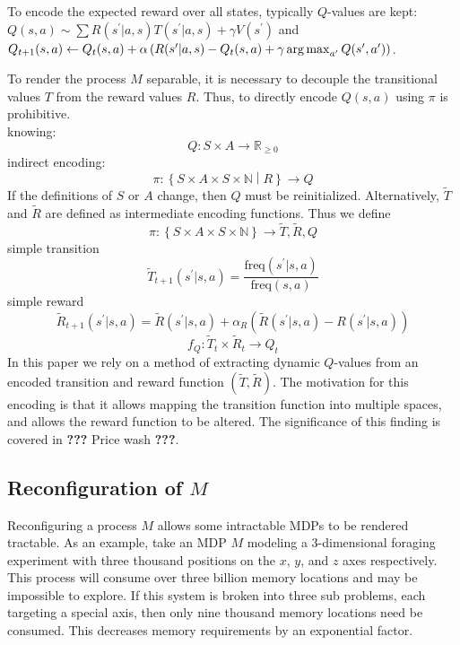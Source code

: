 To encode the expected reward over all states, typically $Q$-values are kept: $ Q(s,a) \sim \sum R(s^\prime|a,s)T(s^\prime|a,s)+\gamma V(s^\prime) $ and $ Q_{t+1}(s,a) \leftarrow Q_t(s,a)+\alpha \left( R(s^\prime|a,s)-Q_t(s,a)+\gamma\operatorname*{arg\,max}_{a^\prime} Q(s^\prime,a^\prime) \right) $.

To render the process $M$ separable, it is necessary to decouple the transitional values $T$ from the reward values $R$. Thus, to directly encode $Q(s,a)$ using $\pi$ is prohibitive.\\
knowing: 
\begin{equation*}
Q: S \times A \to \mathbb{R}_{\geq 0}
\end{equation*}
indirect encoding:
\begin{equation*}
\pi: \left\{ S \times A \times S \times \mathbb{N} \middle| R \right\} \to Q
\end{equation*}
If the definitions of $S$ or $A$ change, then $Q$ must be reinitialized. Alternatively, $\tilde{T}$ and $\tilde{R}$ are defined as intermediate encoding functions. Thus we define
\begin{equation*}
\pi:\left\{S \times A \times S \times \mathbb{N}\right\} \to \tilde{T}, \tilde{R}, Q
\end{equation*} 
simple transition
\begin{equation*}
\tilde{T}_{t+1}(s^\prime|s,a) = \frac{\textrm{freq}(s^\prime|s,a)}{\textrm{freq}(s,a)}
\end{equation*}
simple reward
\begin{equation*}
\tilde{R}_{t+1}(s^\prime|s,a) = \tilde{R}(s^\prime|s,a)+\alpha_R\left( \tilde{R}(s^\prime|s,a)-R(s^\prime|s,a)\right)
\end{equation*}
\begin{equation*}
f_Q: \tilde{T}_t \times \tilde{R}_t \to Q_t
\end{equation*}
In this paper we rely on a method of extracting dynamic $Q$-values from an encoded transition and reward function $( \tilde{T}, \tilde{R} )$. The motivation for this encoding is that it allows mapping the transition function into multiple spaces, and allows the reward function to be altered. The significance of this finding is covered in \textbf{???} Price wash \textbf{???}.

  
\subsection{Reconfiguration of $M$}

Reconfiguring a process $M$ allows some intractable MDPs to be rendered tractable. 
As an example, take an MDP $M$ modeling a 3-dimensional foraging experiment with three thousand positions on the $x$, $y$, and $z$
axes respectively. This process will consume over three billion memory locations and may be impossible to explore. If this system is
broken into three sub problems, each targeting a special axis, then only nine thousand memory locations need be consumed. This decreases memory requirements by an exponential factor.

